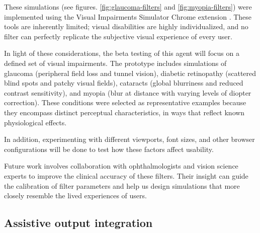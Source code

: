 These simulations (see figures. \ref{fig:glaucoma-filters} and \ref{fig:myopia-filters}) were implemented using the Visual Impairments Simulator Chrome extension \cite{visual_impairments_simulator}. These tools are inherently limited; visual disabilities are highly individualized, and no filter can perfectly replicate the subjective visual experience of every user.


In light of these considerations, the beta testing of this agent will focus on a defined set of visual impairments. The prototype includes simulations of glaucoma (peripheral field loss and tunnel vision\cite{Cassel2021EyeBook}), diabetic retinopathy (scattered blind spots and patchy visual fields\cite{Cassel2021EyeBook}), cataracts (global blurriness and reduced contrast sensitivity\cite{Cassel2021EyeBook}), and myopia (blur at distance with varying levels of diopter correction\cite{Cassel2021EyeBook}). These conditions were selected as representative examples because they encompass distinct perceptual characteristics, in ways that reflect known physiological effects.

In addition, experimenting with different viewports, font sizes, and other browser configurations\cite{chiou2024automatically} will be done to test how these factors affect usability.


Future work involves collaboration with ophthalmologists and vision science experts to improve the clinical accuracy of these filters. Their insight can guide the calibration of filter parameters and help us design simulations that more closely resemble the lived experiences of users.

\subsection{Assistive output integration}

